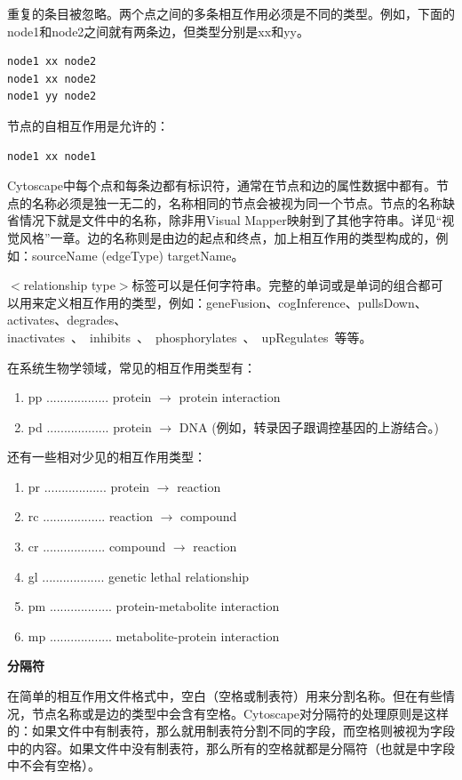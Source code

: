 重复的条目被忽略。两个点之间的多条相互作用必须是不同的类型。例如，下面的node1和node2之间就有两条边，但类型分别是xx和yy。
\begin{verbatim}
node1 xx node2
node1 xx node2
node1 yy node2
\end{verbatim}

节点的自相互作用是允许的：
\begin{verbatim}
node1 xx node1
\end{verbatim}

Cytoscape中每个点和每条边都有标识符，通常在节点和边的属性数据中都有。节点的名称必须是独一无二的，名称相同的节点会被视为同一个节点。节点的名称缺省情况下就是文件中的名称，除非用Visual Mapper映射到了其他字符串。详见``视觉风格''一章。边的名称则是由边的起点和终点，加上相互作用的类型构成的，例如：sourceName (edgeType) targetName。


$<$relationship type$>$标签可以是任何字符串。完整的单词或是单词的组合都可以用来定义相互作用的类型，例如：geneFusion、cogInference、pullsDown、activates、degrades、inactivates~、~inhibits~、~phosphorylates~、~upRegulates~等等。 

在系统生物学领域，常见的相互作用类型有：
\begin{enumerate}
\item  pp .................. protein $\rightarrow$ protein interaction
\item  pd .................. protein $\rightarrow$ DNA   
  (例如，转录因子跟调控基因的上游结合。)
\end{enumerate}

还有一些相对少见的相互作用类型：
\begin{enumerate}
\item  pr .................. protein $\rightarrow$ reaction
\item  rc .................. reaction $\rightarrow$ compound
\item  cr .................. compound $\rightarrow$ reaction
\item  gl .................. genetic lethal relationship
\item  pm .................. protein-metabolite interaction
\item  mp .................. metabolite-protein interaction
\end{enumerate}


\textbf{分隔符}

在简单的相互作用文件格式中，空白（空格或制表符）用来分割名称。但在有些情况，节点名称或是边的类型中会含有空格。Cytoscape对分隔符的处理原则是这样的：如果文件中有制表符，那么就用制表符分割不同的字段，而空格则被视为字段中的内容。如果文件中没有制表符，那么所有的空格就都是分隔符（也就是中字段中不会有空格）。

